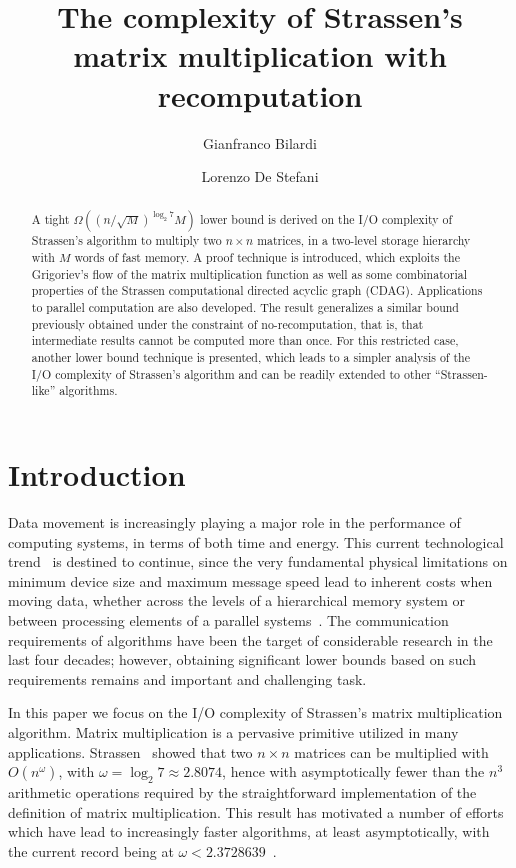 \documentclass[a4paper,UKenglish]{lipics-v2016}
\title{The \io complexity of Strassen's matrix multiplication
  with recomputation}
\author[1]{Gianfranco Bilardi}
\author[2]{Lorenzo De Stefani}
\affil[1]{Department of Information Engineering, University of Padova, Via Gradenigo 6B/Padova, Italy\\
  \texttt{bilardi@dei.unipd.it}}
\affil[2]{Department of Computer Science, Brown University, 115 Waterman Street/Providence, United States of America\\
  \texttt{lorenzo@cs.brown.edu}}
\newcommand{\io }{I/O }
\begin{document}
\maketitle

\begin{abstract}
A tight $\Omega((n/\sqrt{M})^{\log_2 7}M)$ lower bound is derived on
the \io complexity of Strassen's algorithm to multiply two $n \times
n$ matrices, in a two-level storage hierarchy with $M$ words of fast
memory.  A proof technique is introduced, which exploits the Grigoriev's
flow of the matrix multiplication function as well as some
combinatorial properties of the Strassen computational directed acyclic graph (CDAG).
Applications to parallel computation are also developed. The result
generalizes a similar bound previously obtained under the constraint
of no-recomputation, that is, that intermediate results cannot be
computed more than once. For this restricted case, another lower bound
technique is presented, which leads to a simpler analysis of the \io
complexity of Strassen's algorithm and can be readily extended to
other ``Strassen-like'' algorithms.
 \end{abstract}

\section{Introduction}
Data movement is increasingly playing a major role in the performance
of computing systems, in terms of both time and energy. This current
technological trend~\cite{patterson2005getting} is destined to
continue, since the very fundamental physical limitations on minimum
device size and maximum message speed lead to inherent costs when
moving data, whether across the levels of a hierarchical memory system
or between processing elements of a parallel
systems~\cite{bilardi1995horizons}. The communication requirements of
algorithms have been the target of considerable research in the last
four decades; however, obtaining significant lower bounds based on such
requirements remains and important and challenging task.

In this paper we focus on the \io complexity of Strassen's matrix
multiplication algorithm.  Matrix multiplication is a pervasive
primitive utilized in many applications.
Strassen~\cite{strassen1969gaussian} showed that two $n \times n$
matrices can be multiplied with $O(n^{\omega})$, with $\omega = \log_2
7 \approx 2.8074$, hence with asymptotically fewer than the $n^3$
arithmetic operations required by the straightforward implementation
of the definition of matrix multiplication. This result has motivated
a number of efforts which have lead to increasingly faster algorithms,
at least asymptotically, with the current record being at $\omega <
2.3728639$~\cite{legall2014}.
\end{document}
